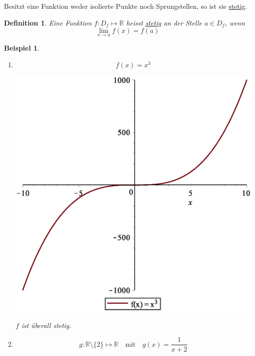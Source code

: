 \documentclass{report}
\newtheorem{mydef}{Definition}
\newtheorem{myexample}{Beispiel}
\begin{document}
Besitzt eine Funktion weder isolierte Punkte noch Sprungstellen, so ist sie \underline{stetig}.
\begin{mydef}Eine Funktion $f: D_f \mapsto \mathbb{R}$ heisst \underline{stetig} an der Stelle $a \in D_f$, wenn
\begin{equation}\lim_{x \to a} f(x) = f(a)\end{equation}
\end{mydef}
\begin{myexample}
\begin{enumerate}
\item \begin{equation}f(x) = x^3\end{equation}
\begin{center}\includegraphics[scale=0.2]{images/limes_x3.eps}\end{center}
$f$ ist überall stetig.
\item \begin{equation}g: \mathbb{R} \setminus \{2\} \mapsto \mathbb{R} \quad \mbox{mit} \quad g(x) = \frac{1}{x+2}\end{equation}

\end{enumerate}
\end{myexample}
\end{document}
